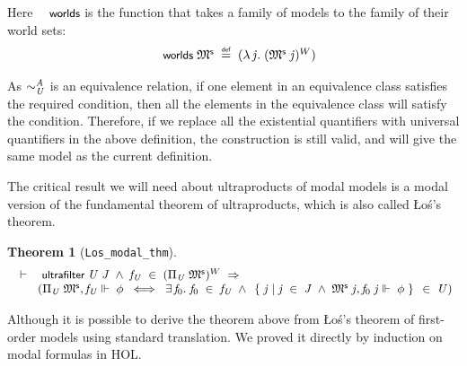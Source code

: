 \documentclass{llncs}
\newtheorem{thm}{Theorem}[chapter]
\newenvironment{holmath}{\begin{displaymath}\begin{array}{l}}{\end{array}\end{displaymath}\ignorespacesafterend}
\renewcommand{\HOLConst}[1]{{\textsf{\upshape\small #1}}}
\renewcommand{\HOLinline}[1]{\ensuremath{#1}}
\renewcommand{\HOLTokenBar}{\mbox{$|$}}
\begin{document}
Here \HOLinline{\HOLConst{worlds}} is the function that takes a family of models to the family of their world sets:
\begin{holmath}
  \HOLConst{worlds}\;\HOLFreeVar{\ensuremath{\mathfrak{M}\sp{\sf s}}}\;\HOLTokenDefEquality{}\;(\HOLTokenLambda{}\HOLBoundVar{j}.\;(\HOLFreeVar{\ensuremath{\mathfrak{M}\sp{\sf s}}}\;\HOLBoundVar{j})\HOLSymConst{\ensuremath{\sp{W}}})
\end{holmath}

As \HOLinline{\sim\sb{\HOLFreeVar{U}}\sp{\HOLFreeVar{A}}} is an equivalence relation, if one element in an equivalence class satisfies the required condition, then all the elements in the equivalence class will satisfy the condition. Therefore, if we replace all the existential quantifiers with universal quantifiers in the above definition, the construction is still valid, and will give the same model as the current definition. 

The critical result we will need about ultraproducts of modal models is a modal version of the fundamental theorem of ultraproducts, which is also called \L o\'s's theorem. 

\begin{thm}[\texttt{Los_modal_thm}]
\begin{holmath}
  \ensuremath{\HOLTokenTurnstile}\HOLConst{ultrafilter}\;\HOLFreeVar{U}\;\HOLFreeVar{J}\;\HOLSymConst{\HOLTokenConj{}}\;\HOLFreeVar{\ensuremath{f\sb{U}}}\;\HOLSymConst{\HOLTokenIn{}}\;(\Pi\sb{\HOLFreeVar{U}}\;\HOLFreeVar{\ensuremath{\mathfrak{M}\sp{\sf s}}})\HOLSymConst{\ensuremath{\sp{W}}}\;\HOLSymConst{\HOLTokenImp{}}\\
\;\;\;\;\;\;\;(\Pi\sb{\HOLFreeVar{U}}\;\HOLFreeVar{\ensuremath{\mathfrak{M}\sp{\sf s}}},\HOLFreeVar{\ensuremath{f\sb{U}}}\ensuremath{\Vdash}\;\HOLFreeVar{\ensuremath{\phi}}\;\HOLSymConst{\HOLTokenEquiv{}}\;\HOLSymConst{\HOLTokenExists{}}\HOLBoundVar{f}\sb{\mathrm{0}}.\;\HOLBoundVar{f}\sb{\mathrm{0}}\;\HOLSymConst{\HOLTokenIn{}}\;\HOLFreeVar{\ensuremath{f\sb{U}}}\;\HOLSymConst{\HOLTokenConj{}}\;\HOLTokenLeftbrace{}\HOLBoundVar{j}\;\HOLTokenBar{}\;\HOLBoundVar{j}\;\HOLSymConst{\HOLTokenIn{}}\;\HOLFreeVar{J}\;\HOLSymConst{\HOLTokenConj{}}\;\HOLFreeVar{\ensuremath{\mathfrak{M}\sp{\sf s}}}\;\HOLBoundVar{j},\HOLBoundVar{f}\sb{\mathrm{0}}\;\HOLBoundVar{j}\ensuremath{\Vdash}\;\HOLFreeVar{\ensuremath{\phi}}\HOLTokenRightbrace{}\;\HOLSymConst{\HOLTokenIn{}}\;\HOLFreeVar{U})
\end{holmath}
\end{thm}
Although it is possible to derive the theorem above from \L o\'s's theorem of first-order models using standard translation. We proved it directly by induction on modal formulas in HOL. 
\end{document}
